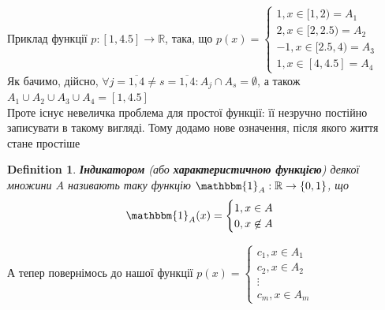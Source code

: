 \documentclass[a4paper, 14pt]{extarticle}
\def\bigline{\vspace{5mm}\\}
\theoremstyle{theoremdd}
\theoremstyle{theoremdd}
\newtheorem{definition}[theorem]{Definition}
\theoremstyle{theoremdd}
\theoremstyle{theoremdd}
\theoremstyle{theoremdd}
\theoremstyle{theoremdd}
\theoremstyle{theoremdd}
\theoremstyle{theoremdd}
\begin{document}
\begin{figure}[H]
\centering
{}
\end{figure}
Приклад функції $p: [1,4.5] \rightarrow \mathbb{R}$, така, що $p(x) = \begin{cases} 1, x \in [1,2) = A_1 \\ 2, x \in [2,2.5) = A_2 \\ -1, x \in [2.5,4) = A_3 \\ 1, x \in [4,4.5] = A_4 \end{cases}$ \\
Як бачимо, дійсно, $\forall j = \overline{1,4} \neq s = \overline{1,4}: A_j \cap A_s = \emptyset$, а також $A_1 \cup A_2 \cup A_3 \cup A_4 = [1,4.5]$
\bigline
Проте існує невеличка проблема для простої функції: її незручно постійно записувати в такому вигляді. Тому додамо нове означення, після якого життя стане простіше
\begin{definition}
\textbf{Індикатором} (або \textbf{характеристичною функцією}) деякої множини $A$ називають таку функцію $\mathbbm{1}_A: \mathbb{R} \to \{0,1\}$, що
\begin{align*}
\mathbbm{1}_A(x) = \begin{cases} 1, x \in A \\ 0, x \not\in A \end{cases}
\end{align*}
\end{definition}
А тепер повернімось до нашої функції $p(x) = \begin{cases} c_1, x \in A_1 \\ c_2, x \in A_2 \\ \vdots \\ c_m, x \in A_m \end{cases}$\\
\end{document}
